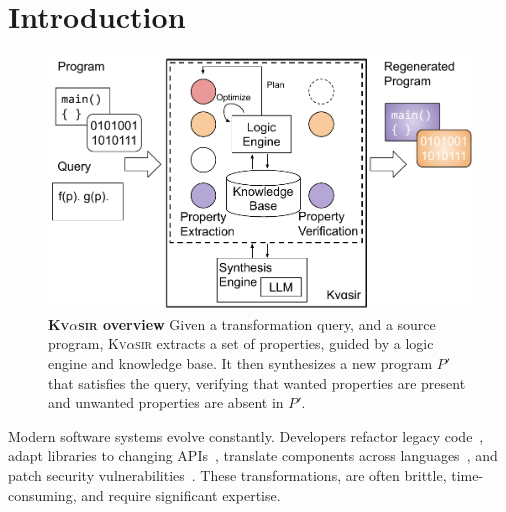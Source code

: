 \documentclass[nonacm,sigplan,review]{acmart}
\newcommand{\sys}{{\scshape Kv{$\alpha$}sir}\xspace}
\begin{document}
\section{Introduction}
\begin{figure}[t]
  \includegraphics[width=.9\columnwidth]{figs/kvasir_overview.pdf}
  \caption{\textbf{\sys overview}
Given a transformation query, and a source program, \sys extracts a set
  of properties,
  guided by a logic engine and knowledge base.
  It then synthesizes a new program $P'$ that satisfies the query, verifying
  that wanted properties are present and unwanted properties are absent in $P'$.
}
  \label{fig:overview}
\end{figure}





Modern software systems evolve constantly.
Developers refactor legacy code~\cite{Fowler99,Mens04,facebook2010redesigns,dropbox2014syncengine},
adapt libraries to changing APIs~\cite{dig2005role,kula2017empiricalstudyimpactrefactoring},
translate components across languages~\cite{manzoor_cli_python,gaultier_rewrite_cpp},
and patch security vulnerabilities~\cite{ikegami2022userefactoringsecurityvulnerability,schneier2013security_vulnerabilities}.
These transformations, are often brittle, time-consuming, and require significant expertise.
\end{document}
